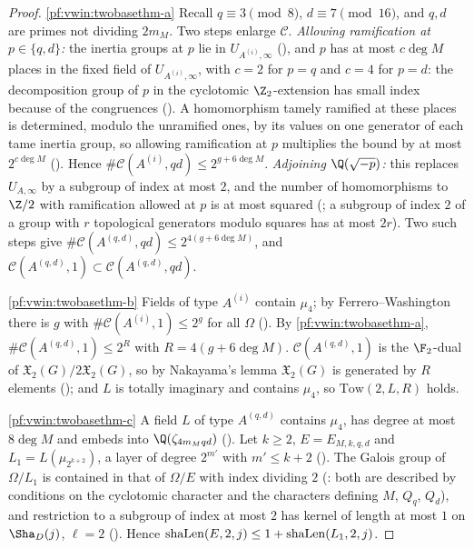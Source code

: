 \begin{proof}
\ref{pf:vwin:twobasethm-a} Recall $q\equiv3\pmod8$, $d\equiv7\pmod{16}$, and $q,d$ are primes not dividing $2m_M$. Two steps enlarge
$\mathcal C$. \emph{Allowing ramification at $p\in\{q,d\}$:} the inertia groups at $p$ lie in $U_{A^{(i)},\infty}$
(), and $p$ has at most $c\deg M$ places in the fixed field of $U_{A^{(i)},\infty}$, with $c=2$ for $p=q$
and $c=4$ for $p=d$: the decomposition group of $p$ in the cyclotomic $\Z_2$-extension has small index because of the congruences
(). A homomorphism tamely ramified at these places is determined, modulo the unramified ones, by its
values on one generator of each tame inertia group, so allowing ramification at $p$ multiplies the bound by at most $2^{c\deg M}$
(). Hence $\#\mathcal C(A^{(i)},qd)\le2^{g+6\deg M}$. \emph{Adjoining $\Q(\sqrt{-p})$:} this replaces
$U_{A,\infty}$ by a subgroup of index at most $2$, and the number of homomorphisms to $\Z/2$ with ramification allowed at $p$ is at most
squared (; a subgroup of index $2$ of a group with $r$ topological generators modulo squares
has at most $2r$). Two such steps give $\#\mathcal C(A^{(q,d)},qd)\le2^{4(g+6\deg M)}$, and $\mathcal C(A^{(q,d)},1)\subset\mathcal C(A^{(q,d)},qd)$.

\ref{pf:vwin:twobasethm-b} Fields of type $A^{(i)}$ contain $\mu_4$; by Ferrero--Washington there is $g$ with $\#\mathcal C(A^{(i)},1)\le2^g$ for
all $\Omega$ (). By \ref{pf:vwin:twobasethm-a}, $\#\mathcal C(A^{(q,d)},1)\le2^R$ with $R=4(g+6\deg M)$.
$\mathcal C(A^{(q,d)},1)$ is the $\F_2$-dual of $\mathfrak X_2(G)/2\mathfrak X_2(G)$, so by Nakayama's lemma $\mathfrak X_2(G)$ is generated by
$R$ elements (); and $L$ is totally imaginary and contains $\mu_4$, so $\mathrm{Tow}(2,L,R)$ holds.

\ref{pf:vwin:twobasethm-c} A field $L$ of type $A^{(q,d)}$ contains $\mu_4$, has degree at most $8\deg M$ and embeds into
$\Q(\zeta_{4m_Mqd})$ (). Let $k\ge2$, $E=E_{M,k,q,d}$ and $L_1=L(\mu_{2^{k+2}})$, a layer of degree $2^{m'}$
with $m'\le k+2$ (). The Galois group of $\Omega/L_1$ is contained in that of $\Omega/E$ with index dividing
$2$ (: both are described by conditions on the cyclotomic character and the characters defining $M$,
$Q_q$, $Q_d$), and restriction to a subgroup of index at most $2$ has kernel of length at most $1$ on $\Sha_D(j)$, $\ell=2$
(). Hence $\mathrm{shaLen}(E,2,j)\le1+\mathrm{shaLen}(L_1,2,j)$.
\end{proof}

